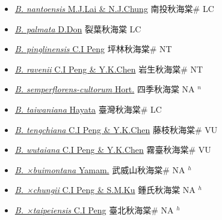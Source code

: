 \begin{itemize}
\begin{itemize}
        \item[] \href{http://www.theplantlist.org/tpl1.1/search?q=Begonia+nantoensis}{\textit{B. nantoensis} M.J.Lai \& N.J.Chung}   南投秋海棠\# LC
        \item[] \href{http://www.theplantlist.org/tpl1.1/search?q=Begonia+palmata}{\textit{B. palmata} D.Don}   裂葉秋海棠 LC
        \item[] \href{http://www.theplantlist.org/tpl1.1/search?q=Begonia+pinglinensis}{\textit{B. pinglinensis} C.I Peng}   坪林秋海棠\# NT
        \item[] \href{http://www.theplantlist.org/tpl1.1/search?q=Begonia+ravenii}{\textit{B. ravenii} C.I Peng \& Y.K.Chen}   岩生秋海棠\# NT
        \item[] \href{http://www.theplantlist.org/tpl1.1/search?q=Begonia+semperflorens-cultorum}{\textit{B. semperflorens-cultorum} Hort.}   四季秋海棠 NA $^n$
        \item[] \href{http://www.theplantlist.org/tpl1.1/search?q=Begonia+taiwaniana}{\textit{B. taiwaniana} Hayata}   臺灣秋海棠\# LC
        \item[] \href{http://www.theplantlist.org/tpl1.1/search?q=Begonia+tengchiana}{\textit{B. tengchiana} C.I Peng \& Y.K.Chen}   藤枝秋海棠\# VU
        \item[] \href{http://www.theplantlist.org/tpl1.1/search?q=Begonia+wutaiana}{\textit{B. wutaiana} C.I Peng \& Y.K.Chen}   霧臺秋海棠\# VU
        \item[] \href{http://www.theplantlist.org/tpl1.1/search?q=Begonia+×buimontana}{\textit{B. ×buimontana} Yamam.}   武威山秋海棠\# NA $^h$
        \item[] \href{http://www.theplantlist.org/tpl1.1/search?q=Begonia+×chungii}{\textit{B. ×chungii} C.I Peng \& S.M.Ku}   鍾氏秋海棠 NA $^h$
        \item[] \href{http://www.theplantlist.org/tpl1.1/search?q=Begonia+×taipeiensis}{\textit{B. ×taipeiensis} C.I Peng}   臺北秋海棠\# NA $^h$
  \end{itemize}
  \end{itemize}
